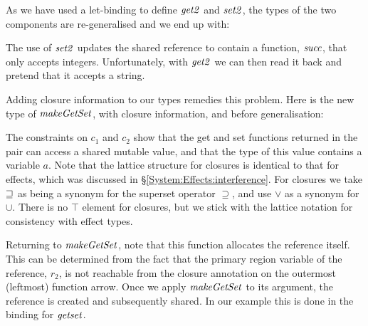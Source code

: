 
As we have used a let-binding to define $\operatorname{\mathit{get2}}$ and $\operatorname{\mathit{set2}}$, the types of the two components are re-generalised and we end up with:


The use of $\operatorname{\mathit{set2}}$ updates the shared reference to contain a function, $\operatorname{\mathit{succ}}$, that only accepts integers. Unfortunately, with $\operatorname{\mathit{get2}}$ we can then read it back and pretend that it accepts a string.

Adding closure information to our types remedies this problem. Here is the new type of $\operatorname{\mathit{makeGetSet}}$, with closure information, and before generalisation:


The constraints on $c_1$ and $c_2$ show that the get and set functions returned in the pair can access a shared mutable value, and that the type of this value contains a variable $a$. Note that the lattice structure for closures is identical to that for effects, which was discussed in \S\ref{System:Effects:interference}. For closures we take $\sqsupseteq$ as being a synonym for the superset operator $\supseteq$, and use $\lor$ as a synonym for $\cup$. There is no $\top$ element for closures, but we stick with the lattice notation for consistency with effect types.

Returning to $\operatorname{\mathit{makeGetSet}}$, note that this function allocates the reference itself. This can be determined from the fact that the primary region variable of the reference, $r_2$, is not reachable from the closure annotation on the outermost (leftmost) function arrow. Once we apply $\operatorname{\mathit{makeGetSet}}$ to its argument, the reference is created and subsequently shared. In our example this is done in the binding for $\operatorname{\mathit{getset}}$.

